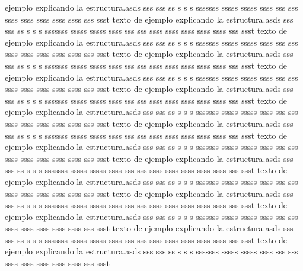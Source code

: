 ejemplo explicando la estructura.asds sss sss ss s s s sssssss sssss sssss ssss sss sss ssss ssss ssss ssss ssss sss ssst texto de ejemplo explicando la estructura.asds sss sss ss s s s sssssss sssss sssss ssss sss sss ssss ssss ssss ssss ssss sss ssst texto de ejemplo explicando la estructura.asds sss sss ss s s s sssssss sssss sssss ssss sss sss ssss ssss ssss ssss ssss sss ssst texto de ejemplo explicando la estructura.asds sss sss ss s s s sssssss sssss sssss ssss sss sss ssss ssss ssss ssss ssss sss ssst texto de ejemplo explicando la estructura.asds sss sss ss s s s sssssss sssss sssss ssss sss sss ssss ssss ssss ssss ssss sss ssst texto de ejemplo explicando la estructura.asds sss sss ss s s s sssssss sssss sssss ssss sss sss ssss ssss ssss ssss ssss sss ssst texto de ejemplo explicando la estructura.asds sss sss ss s s s sssssss sssss sssss ssss sss sss ssss ssss ssss ssss ssss sss ssst texto de ejemplo explicando la estructura.asds sss sss ss s s s sssssss sssss sssss ssss sss sss ssss ssss ssss ssss ssss sss ssst texto de ejemplo explicando la estructura.asds sss sss ss s s s sssssss sssss sssss ssss sss sss ssss ssss ssss ssss ssss sss ssst texto de ejemplo explicando la estructura.asds sss sss ss s s s sssssss sssss sssss ssss sss sss ssss ssss ssss ssss ssss sss ssst texto de ejemplo explicando la estructura.asds sss sss ss s s s sssssss sssss sssss ssss sss sss ssss ssss ssss ssss ssss sss ssst texto de ejemplo explicando la estructura.asds sss sss ss s s s sssssss sssss sssss ssss sss sss ssss ssss ssss ssss ssss sss ssst texto de ejemplo explicando la estructura.asds sss sss ss s s s sssssss sssss sssss ssss sss sss ssss ssss ssss ssss ssss sss ssst texto de ejemplo explicando la estructura.asds sss sss ss s s s sssssss sssss sssss ssss sss sss ssss ssss ssss ssss ssss sss ssst texto de ejemplo explicando la estructura.asds sss sss ss s s s sssssss sssss sssss ssss sss sss ssss ssss ssss ssss ssss sss ssst 
